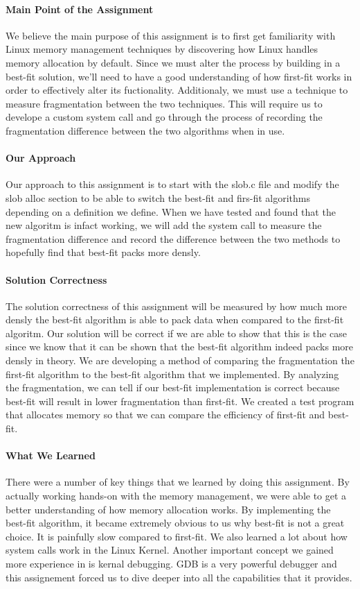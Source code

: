 \documentclass[titlepage,draftclsnofoot,onecolumn]{article}
\begin{document}
\paragraph{Main Point of the Assignment}
We believe the main purpose of this assignment is to first get familiarity with Linux memory management techniques by discovering how Linux handles memory allocation by default. Since we must alter the process by building in a best-fit solution, we'll need to have a good understanding of how first-fit works in order to effectively alter its fuctionality. Additionaly, we must use a technique to measure fragmentation between the two techniques. This will require us to develope a custom system call and go through the process of recording the fragmentation difference between the two algorithms when in use.

\paragraph{Our Approach}
Our approach to this assignment is to start with the slob.c file and modify the slob alloc section to be able to switch the best-fit and firs-fit algorithms depending on a definition we define. When we have tested and found that the new algoritm is infact working, we will add the system call to measure the fragmentation difference and record the difference between the two methods to hopefully find that best-fit packs more densly.

\paragraph{Solution Correctness}
The solution correctness of this assignment will be measured by how much more densly the best-fit algorithm is able to pack data when compared to the first-fit algoritm. Our solution will be correct if we are able to show that this is the case since we know that it can be shown that the best-fit algorithm indeed packs more densly in theory. We are developing a method of comparing the fragmentation the first-fit algorithm to the best-fit algorithm that we implemented. By analyzing the fragmentation, we can tell if our best-fit implementation is correct because best-fit will result in lower fragmentation than first-fit. We created a test program that allocates memory so that we can compare the efficiency of first-fit and best-fit.

\paragraph{What We Learned}
There were a number of key things that we learned by doing this assignment. By actually working hands-on with the memory management, we were able to get a better understanding of how memory allocation works. By implementing the best-fit algorithm, it became extremely obvious to us why best-fit is not a great choice. It is painfully slow compared to first-fit. We also learned a lot about how system calls work in the Linux Kernel. Another important concept we gained more experience in is kernal debugging. GDB is a very powerful debugger and this assignement forced us to dive deeper into all the capabilities that it provides.
\end{document}
